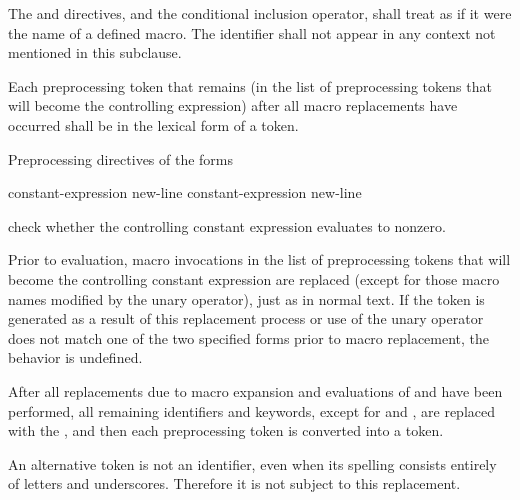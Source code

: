 \pnum
The  and  directives, and
the  conditional inclusion operator,
shall treat  as if it were the name of a defined macro.
The identifier  shall not appear
in any context not mentioned in this subclause.

\pnum
Each preprocessing token that remains (in the list of preprocessing tokens that
will become the controlling expression)
after all macro replacements have occurred
shall be in the lexical form of a token.

\pnum
Preprocessing directives of the forms

\begin{ncbnftab}
%
\>\>constant-expression new-line \br
{}%
\>\>constant-expression new-line 
\end{ncbnftab}

check whether the controlling constant expression evaluates to nonzero.

\pnum
Prior to evaluation,
macro invocations in the list of preprocessing tokens
that will become the controlling constant expression
are replaced
(except for those macro names modified by the
unary operator),
just as in normal text.
If the token
is generated as a result of this replacement process
or use of the
unary operator does not match one of the two specified forms
prior to macro replacement,
the behavior is undefined.

\pnum
After all replacements due to macro expansion and
evaluations of  and
have been performed,
all remaining identifiers and keywords,
except for
and
,
are replaced with the 
,
and then each preprocessing token is converted into a token.
\begin{note}
An alternative
token is not an identifier,
even when its spelling consists entirely of letters and underscores.
Therefore it is not subject to this replacement.
\end{note}

